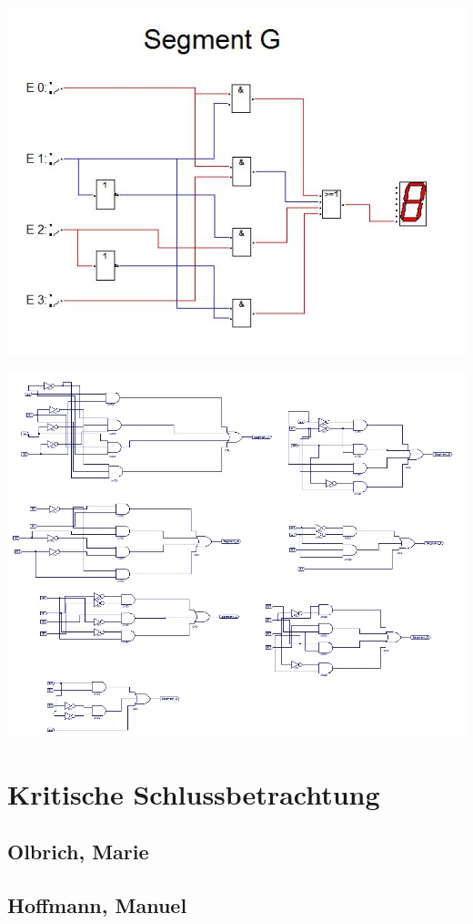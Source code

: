 \documentclass[a4paper, 11pt, fleqn, DIV=10, twoside, BCOR=10mm]{scrreprt}
\begin{document}
\begin{center}
\includegraphics[width=0.8\columnwidth]{DT4Graphics/Segment_G.jpg}


\includegraphics[width=1.2\columnwidth]{DT4Graphics/alle_schaltungen.jpg}
\end{center}
\newpage
\chapter{Kritische Schlussbetrachtung}
\section{Olbrich, Marie}
 
\section{Hoffmann, Manuel}

\end{document}
